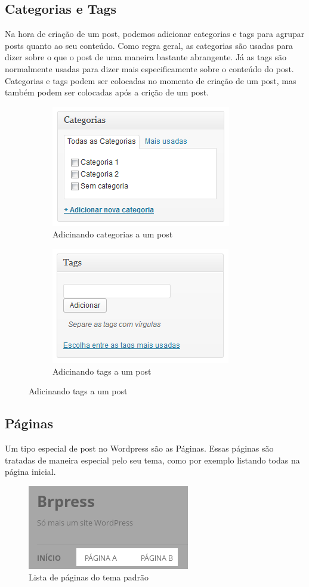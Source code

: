 \documentclass[12pt,onecolumn]{article}
\begin{document}
	\subsection{Categorias e Tags}
		Na hora de criação de um post, podemos adicionar categorias e tags 
		para agrupar posts quanto ao seu conteúdo. Como regra geral, as
		categorias são usadas para dizer sobre o que o post de uma maneira
		bastante abrangente. Já as tags são normalmente usadas para dizer
		mais especificamente sobre o conteúdo do post. Categorias e tags
		podem ser colocadas no momento de criação de um post, mas
		também podem ser colocadas após a crição de um post.
		\begin{figure}[H]
			\begin{subfigure}{.55\textwidth}
				\centering
				\includegraphics{categorias1.png}
				\caption{Adicinando categorias a um post}
			\end{subfigure}
			\begin{subfigure}{.4\textwidth}
				\centering
				\includegraphics{tags1.png}
				\caption{Adicinando tags a um post}
			\end{subfigure}
		\end{figure}

	\subsection{Páginas}
		Um tipo especial de post no Wordpress são as Páginas.
		Essas páginas são tratadas de maneira especial pelo seu tema, como por
		exemplo listando todas na página inicial.
		\begin{figure}[H]
			\centering
			\includegraphics{page1.png}
			\caption{Lista de páginas do tema padrão}
		\end{figure}
		
\end{document}
